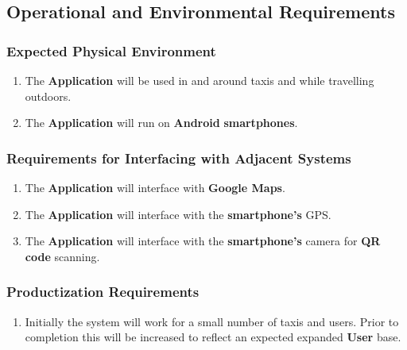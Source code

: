 \documentclass[english]{article}
\begin{document}

\subsection{Operational and Environmental Requirements}
\label{sub:operational_and_environmental_requirements}

\subsubsection{Expected Physical Environment}
\label{ssub:expected_physical_environment}
\begin{enumerate}[{EPE}1. ]
	\item The \textbf{Application} will be used in and around taxis and while travelling outdoors.
	\item The \textbf{Application} will run on  \textbf{Android} \textbf{smartphones}.
\end{enumerate}

\subsubsection{Requirements for Interfacing with Adjacent Systems}
\label{ssub:requirements_for_interfacing_with_adjacent_systems}
\begin{enumerate}[{RIAS}1. ]
	\item The \textbf{Application} will interface with \textbf{Google Maps}.
	\item The \textbf{Application} will interface with the \textbf{smartphone's} GPS.
	\item The \textbf{Application} will interface with the \textbf{smartphone's} camera for \textbf{QR code} scanning.
\end{enumerate}

\subsubsection{Productization Requirements}
\label{ssub:productization_requirements}
\begin{enumerate}[{PR}1. ]
	\item Initially the system will work for a small number of taxis and users. Prior to completion this will be increased to reflect an expected expanded \textbf{User} base.
\end{enumerate}
\end{document}

